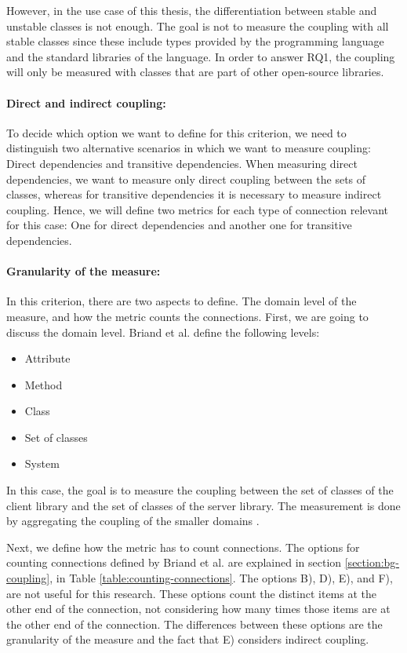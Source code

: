 However, in the use case of this thesis, the differentiation between stable and unstable classes is not enough. The goal is not to measure the coupling with all stable classes since these include types provided by the programming language and the standard libraries of the language. In order to answer RQ1, the coupling will only be measured with classes that are part of other open-source libraries.

\paragraph{Direct and indirect coupling:}
To decide which option we want to define for this criterion, we need to distinguish two alternative scenarios in which we want to measure coupling: Direct dependencies and transitive dependencies. When measuring direct dependencies, we want to measure only direct coupling between the sets of classes, whereas for transitive dependencies it is necessary to measure indirect coupling. Hence, we will define two metrics for each type of connection relevant for this case: One for direct dependencies and another one for transitive dependencies.

\paragraph{Granularity of the measure:}
In this criterion, there are two aspects to define. The domain level of the measure, and how the metric counts the connections. First, we are going to discuss the domain level. Briand et al. define the following levels:

\begin{itemize}[noitemsep]
  \renewcommand\labelitemi{--}
  \item Attribute
  \item Method
  \item Class
  \item Set of classes
  \item System
\end{itemize}

\blankls
In this case, the goal is to measure the coupling between the set of classes of the client library and the set of classes of the server library. The measurement is done by aggregating the coupling of the smaller domains \cite{briand1999unified}.

Next, we define how the metric has to count connections. The options for counting connections defined by Briand et al. are explained in section \ref{section:bg-coupling}, in Table \ref{table:counting-connections}. The options B), D), E), and F), are not useful for this research. These options count the distinct items at the other end of the connection, not considering how many times those items are at the other end of the connection. The differences between these options are the granularity of the measure and the fact that E) considers indirect coupling.

